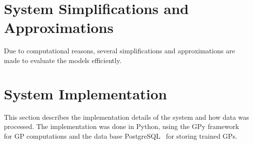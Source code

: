 \section{System Simplifications and Approximations}
Due to computational reasons, several simplifications and
approximations are made to evaluate the models efficiently.



\section{System Implementation}
This section describes the implementation details of the system and
how data was processed. The implementation was done in Python, using the GPy
framework~\cite{gpy2014} for GP computations and the data base
PostgreSQL~\cite{BibEntry2019Feb} for storing trained GPs.

